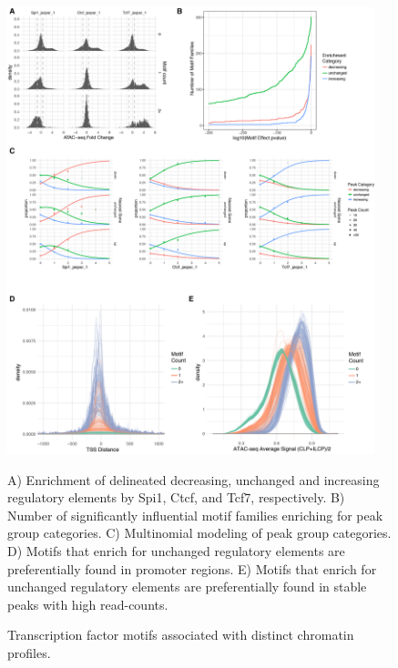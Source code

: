 \begin{figure}[p]
\begin{center}
	\includegraphics[width=0.95\textwidth]{figures/chapter4/Figure_4_motif_dynamics_raster}
\end{center}
	\caption{Transcription factor motifs associated with distinct chromatin profiles.} 
	A) Enrichment of delineated decreasing, unchanged and increasing regulatory elements by Spi1, Ctcf, and Tcf7, respectively. B) Number of significantly influential motif families enriching for peak group categories. C) Multinomial modeling of peak group categories. D) Motifs that enrich for unchanged regulatory elements are preferentially found in promoter regions. E) Motifs that enrich for unchanged regulatory elements are preferentially found in stable peaks with high read-counts.
	\label{fig:chap4_motif}
\end{figure}

